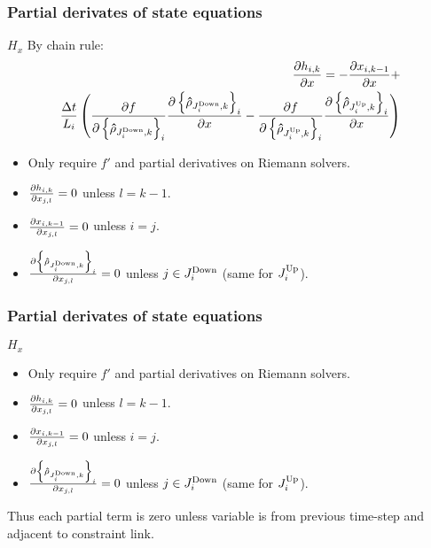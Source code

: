 \begin{frame}[t]\frametitle{Partial derivates of state equations}

\begin{block}{$H_x$}
By chain rule:
\begin{align*}
\frac{\partial h_{i,k}}{\partial x}=-\frac{\partial x_{i,k-1}}{\partial x}+\\
\frac{\Delta t}{L_{i}}\left(\frac{\partial f}{\partial\left\{ \mathbf{\hat{\rho}}_{J_{i}^{\text{Down}},k}\right\} _{i}}\frac{\partial\left\{ \mathbf{\hat{\rho}}_{J_{i}^{\text{Down}},k}\right\} _{i}}{\partial x}-\frac{\partial f}{\partial\left\{ \mathbf{\hat{\rho}}_{J_{i}^{\text{Up}},k}\right\} _{i}}\frac{\partial\left\{ \mathbf{\hat{\rho}}_{J_{i}^{\text{Up}},k}\right\} _{i}}{\partial x}\right)    
\end{align*}

\begin{itemize}
    \item Only require $f'$ and partial derivatives on Riemann solvers.
    \item $\frac{\partial h_{i,k}}{\partial x_{j,l}} = 0$ unless $l = k - 1$.
    \item $\frac{\partial x_{i,k-1}}{\partial x_{j,l}} = 0$ unless $i = j$.
    \item $\frac{\partial\left\{ \mathbf{\hat{\rho}}_{J_{i}^{\text{Down}},k}\right\}_{i}}{\partial x_{j,l}} = 0$ unless $j \in J_{i}^{\text{Down}}$ (same for $J_{i}^{\text{Up}}$).
\end{itemize}
\end{block}
\end{frame}

\begin{frame}[t]\frametitle{Partial derivates of state equations}

\begin{block}{$H_x$}
\begin{itemize}
    \item Only require $f'$ and partial derivatives on Riemann solvers.
    \item $\frac{\partial h_{i,k}}{\partial x_{j,l}} = 0$ unless $l = k - 1$.
    \item $\frac{\partial x_{i,k-1}}{\partial x_{j,l}} = 0$ unless $i = j$.
    \item $\frac{\partial\left\{ \mathbf{\hat{\rho}}_{J_{i}^{\text{Down}},k}\right\}_{i}}{\partial x_{j,l}} = 0$ unless $j \in J_{i}^{\text{Down}}$ (same for $J_{i}^{\text{Up}}$).
\end{itemize}
Thus each partial term is zero unless variable is from previous time-step and adjacent to constraint link.
\end{block}
\end{frame}

